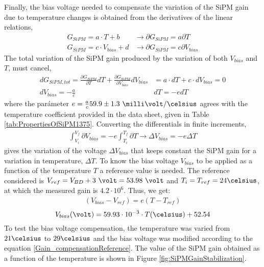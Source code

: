 Finally, the bias voltage needed to compensate the variation of the SiPM gain due to temperature changes is obtained from the derivatives of the linear relations,
\begin{equation*}
\begin{split}
G_{SiPM}=a \cdot{} T + b  &\longrightarrow \partial G_{SiPM}= a \partial T\\
G_{SiPM}=c \cdot{} V_{bias} + d &\longrightarrow \partial G_{SiPM}= c \partial V_{bias}
\label{Gain_compensationVariations}
\end{split}
\end{equation*} 
The total variation of the SiPM gain produced by the variation of both $V_{bias}$ and $T$, must cancel,
\begin{equation*}
\begin{split}
d G_{SiPM, tot}= \frac{\partial G_{SiPM}}{\partial T} dT + \frac{\partial G_{SiPM}}{\partial V_{bias}} dV_{bias}& = a \cdot{} dT + c \cdot{} dV_{bias} = 0\\ 
dV_{bias}  = - \frac{a}{c}& dT = - e dT
\label{Gain_compensation0}
\end{split}
\end{equation*} 
where the parámeter $e= \frac{a}{c} 59.9 \pm 1.3~\milli\volt/\celsius $ agrees with the temperature coefficient provided in the data sheet, given in Table \ref{tab:PropertiesOfSiPM1375}. Converting the differentials in finite increments,
\begin{equation}
\begin{split}
\int_{V_i}^{V_f}\partial V_{bias}  = -e\int_{T_i}^{T_f}\partial T \longrightarrow \Delta V_{bias} = -e \Delta T
\label{Gain_compensationIntegring}
\end{split}
\end{equation} 
gives the variation of the voltage $\Delta V_{bias}$ that keeps constant the SiPM gain for a variation in temperature, $\Delta T$. To know the bias voltage $V_{bias}$ to be applied as a function of the temperature $T$ a reference value is needed. The reference considered is $V_{ref}= V_{BD}+3~\volt = 53.98~\volt$ and $T_i=T_{ref}=24\celsius$, at which the measured gain is $4.2 \cdot{} 10^{6}$. Thus, we get:
\begin{equation*}
\begin{split}
(V_{bias}-V_{ref} )= e \left( T -T_{ref} \right) 
\label{Gain_compensationEquation}
\end{split}
\end{equation*}
\begin{equation}
V_{bias}(\volt)= 59.93 \cdot{} 10^{-3} \cdot{} T(\celsius) + 52.54
\label{Gain_compensationReference}
\end{equation}  
To test the bias voltage compensation, the temperature was varied from $21\celsius$ to $29\celsius$ and the bias voltage was modified according to the equation \ref{Gain_compensationReference}. The value of the SiPM gain obtained as a function of the temperature is shown in Figure \ref{fig:SiPMGainStabilization}.

